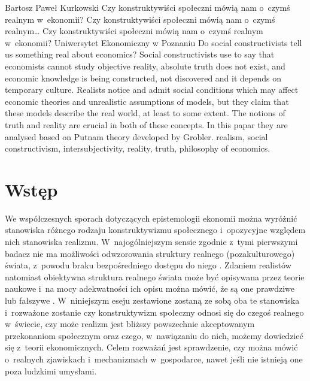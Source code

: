 \begin{artplenv}{Bartosz Paweł Kurkowski}
	{Czy konstruktywiści społeczni mówią nam o~czymś realnym w~ekonomii?}
	{Czy konstruktywiści społeczni mówią nam o~czymś realnym\ldots}
	{Czy konstruktywiści społeczni mówią nam o~czymś realnym\\w~ekonomii?}
	{Uniwersytet Ekonomiczny w Poznaniu}
	{Do social constructivists tell us something real about economics?}
	{Social constructivists use to say that economists cannot study objective reality, absolute truth does not exist, and economic
		knowledge is being constructed, not discovered and it depends on temporary culture. Realists notice and admit social
		conditions which may affect economic theories and unrealistic assumptions of models, but they claim that these models
		describe the real world, at least to some extent. The notions of truth and reality are crucial in both of these concepts. In this papar they are analysed based on Putnam theory developed by Grobler.}
	{realism, social constructivism, intersubjectivity, reality, truth, philosophy of economics.}



\section*{Wstęp}

\lettrine[loversize=0.13,lines=2,lraise=-0.05,nindent=0em,findent=0.2pt]%
{W}{}e współczesnych sporach dotyczących epistemologii ekonomii można wyróżnić stanowiska różnego rodzaju konstruktywizmu
społecznego i~opozycyjne względem nich stanowiska realizmu. W~najogólniejszym sensie zgodnie z~tymi pierwszymi badacz
nie ma możliwości odwzorowania struktury realnego (pozakulturowego) świata, z~powodu braku bezpośredniego dostępu do
niego
\parencite[s.~30]{zboron_teorie_2009}.
Zdaniem realistów natomiast obiektywna struktura realnego świata
może być opisywana przez teorie naukowe i~na mocy adekwatności ich opisu można mówić, że są one prawdziwe lub fałszywe
\parencite[s.~74]{kincaid_realistic_2009}.
W~niniejszym eseju zestawione zostaną ze sobą oba te stanowiska i~rozważone
zostanie czy konstruktywizm społeczny odnosi się do czegoś realnego w~świecie, czy może realizm jest bliższy
powszechnie akceptowanym przekonaniom społecznym oraz czego, w~nawiązaniu do nich, możemy dowiedzieć się z~teorii
ekonomicznych. Celem rozważań jest sprawdzenie, czy można mówić o~realnych zjawiskach i~mechanizmach w~gospodarce,
nawet jeśli nie istnieją one poza ludzkimi umysłami.


\end{artplenv}
